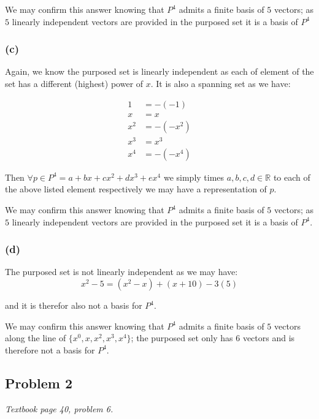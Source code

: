 \documentclass[11pt]{article}
\begin{document}
We may confirm this answer knowing that $P^4$ admits a finite basis of $5$ vectors; as $5$ linearly independent vectors are provided in the purposed set it is a basis of $P^4$

\subsubsection*{(c)}

Again, we know the purposed set is linearly independent as each of element of the set has a different (highest) power of $x$. It is also a spanning set as we have:

\begin{align*}
    1 &= -(-1) \\
    x &= x \\
    x^2 &= -(-x^2) \\
    x^3 &= x^3 \\
    x^4 &= -(-x^4)
\end{align*}

Then $\forall p \in P^4 = a + bx + cx^2 + dx^3 + ex^4$ we simply times $a, b, c, d \in \mathbb{R}$ to each of the above listed element respectively we may have a representation of $p$.

We may confirm this answer knowing that $P^4$ admits a finite basis of $5$ vectors; as $5$ linearly independent vectors are provided in the purposed set it is a basis of $P^4$.

\subsubsection*{(d)}

The purposed set is not linearly independent as we may have:
\begin{equation*}
    x^2 - 5 = (x^2 - x) + (x + 10) - 3(5)
\end{equation*}

and it is therefor also not a basis for $P^4$.

We may confirm this answer knowing that $P^4$ admits a finite basis of $5$ vectors along the line of $\{x^0, x, x^2, x^3, x^4 \}$; the purposed set only has $6$ vectors and is therefore not a basis for $P^4$.

\subsection*{Problem 2}
\textit{Textbook page 40, problem 6.}\newline
\end{document}
